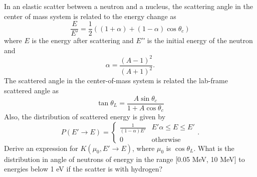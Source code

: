 \documentclass[12pt]{article}
\newenvironment{problem}[2][Problem]{\begin{trivlist}
\item[\hskip \labelsep {\bfseries #1}\hskip \labelsep {\bfseries #2:}]\hspace{0.3in}\newline\newline}{\end{trivlist}}
\begin{document}
\begin{problem}{2}
In an elastic scatter between a neutron and a nucleus, the scattering angle in the center of mass system is
related to the energy change as
\begin{equation}\label{eq:E}
 \frac{E}{E'} = \frac{1}{2}\left((1+\alpha) + (1-\alpha)\cos \theta_c\right)
\end{equation}
where $E$ is the energy after scattering and $E'$′ is the initial energy of the neutron and
\begin{equation}
\alpha = \frac{(A-1)^2}{(A+1)^2}.
\end{equation}
The scattered angle in the center-of-mass system is related the lab-frame scattered angle as
\begin{equation}\label{eq:tan}
\tan \theta_L = \frac{A\sin \theta_c}{1 + A\cos \theta_c}
\end{equation}
Also, the distribution of scattered energy is given by
\begin{equation} \label{pdf}
P(E'\rightarrow E) = \left\{\begin{matrix}
\frac{1}{(1-\alpha)E'} & E'\alpha \leq E \leq E' \\ 
 0 & \text{otherwise}
\end{matrix}\right. .
\end{equation}
Derive an expression for $K( \mu_0, E'\rightarrow E)$, where $\mu_0$ is $\cos \theta_L$. What is the distribution in angle of neutrons of energy
in the range [0.05 MeV, 10 MeV] to energies below 1 eV if the scatter is with hydrogen?

\end{problem}
\end{document}
